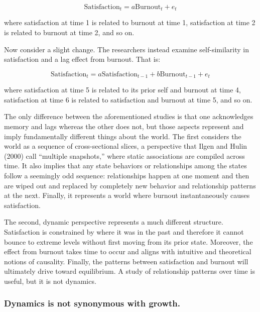 \documentclass[english,,man]{apa6}
\theoremstyle{definition}
\theoremstyle{definition}
\theoremstyle{definition}
\theoremstyle{remark}
\begin{document}
\begin{equation}
\textrm{Satisfaction}_{t} = a \textrm{Burnout}_{t} + e_{t}
\end{equation}

\noindent where satisfaction at time 1 is related to burnout at time 1,
satisfaction at time 2 is related to burnout at time 2, and so on.

Now consider a slight change. The researchers instead examine
self-similarity in satisfaction and a lag effect from burnout. That is:

\begin{equation}
\textrm{Satisfaction}_{t} = a \textrm{Satisfaction}_{t - 1} + b \textrm{Burnout}_{t - 1} + e_{t}
\end{equation}

\noindent where satisfaction at time 5 is related to its prior self and
burnout at time 4, satisfaction at time 6 is related to satisfaction and
burnout at time 5, and so on.

The only difference between the aforementioned studies is that one
acknowledges memory and lags whereas the other does not, but those
aspects represent and imply fundamentally different things about the
world. The first considers the world as a sequence of cross-sectional
slices, a perspective that Ilgen and Hulin (2000) call \enquote{multiple
snapshots,} where static associations are compiled across time. It also
implies that any state behaviors or relationships among the states
follow a seemingly odd sequence: relationships happen at one moment and
then are wiped out and replaced by completely new behavior and
relationship patterns at the next. Finally, it represents a world where
burnout instantaneously causes satisfaction.

The second, dynamic perspective represents a much different structure.
Satisfaction is constrained by where it was in the past and therefore it
cannot bounce to extreme levels without first moving from its prior
state. Moreover, the effect from burnout takes time to occur and aligns
with intuitive and theoretical notions of causality. Finally, the
patterns between satisfaction and burnout will ultimately drive toward
equilibrium. A study of relationship patterns over time is useful, but
it is not dynamics.

\hypertarget{dynamics-is-not-synonymous-with-growth.}{%
\subsubsection{Dynamics is not synonymous with
growth.}\label{dynamics-is-not-synonymous-with-growth.}}
\end{document}

